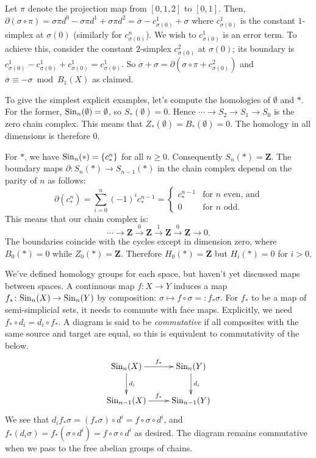 Let $\pi$ denote the projection map from $[0,1,2]$ to $[0,1]$. Then, $\partial(\sigma\circ\pi)=\sigma\pi d^0-\sigma\pi d^1 +\sigma\pi d^2=\overline{\sigma}-c^1_{\sigma(0)}+\sigma$ where $c^1_{\sigma(0)}$ is the constant $1$-simplex at $\sigma(0)$ (similarly for $c^n_{\sigma(0)}$). We wish to $c^1_{\sigma(0)}$ is an error term. To achieve this, consider the constant $2$-simplex $c^2_{\sigma(0)}$ at $\sigma(0)$; its boundary is $c^1_{\sigma(0)}-c^1_{\sigma(0)}+c^1_{\sigma(0)}=c^1_{\sigma(0)}$. So $\overline{\sigma}+\sigma=\partial(\sigma\circ\pi + c^2_{\sigma(0)})$ and $\overline{\sigma}\equiv -\sigma\bmod B_1(X)$ as claimed.

To give the simplest explicit examples, let's compute the homologies of $\emptyset$ and $\ast$. For the former, $\mathrm{Sin}_n(\emptyset)=\emptyset$, so $S_\ast(\emptyset)=0$. Hence $\cdots\to S_2\to S_1\to S_0$ is the zero chain complex. This means that $Z_\ast(\emptyset)=B_\ast(\emptyset)=0$. The homology in all dimensions is therefore $0$.

For $\ast$, we have $\mathrm{Sin}_n(\ast)=\{c^n_\ast\}$ for all $n\geq 0$. Consequently $S_n(\ast)=\mathbf{Z}$. The boundary maps $\partial\colon S_n(\ast)\to S_{n-1}(\ast)$ in the chain complex depend on the parity of $n$ as follows:
\[\partial(c^n_\ast)=\sum_{i=0}^{n}(-1)^i c^{n-1}_\ast=
\begin{cases}
    c^{n-1}_* & \text{for } n \text{ even, and}\\
    0 & \text{for } n \text{ odd.}
  \end{cases}
\]
This means that our chain complex is:
$$\cdots\to\mathbf{Z}\xrightarrow{0}\mathbf{Z}\xrightarrow{1}\mathbf{Z}\xrightarrow{0}\mathbf{Z}\to 0.$$
The boundaries coincide with the cycles except in dimension zero, where $B_0(\ast)=0$ while $Z_0(\ast)=\mathbf{Z}$. Therefore $ H_0(\ast)=\mathbf{Z}$ but $ H_i(\ast)=0$ for $i>0$.

We've defined homology groups for each space, but haven't yet discussed maps between spaces. A continuous map $f\colon X\to Y$ induces a map $f_\ast\colon \mathrm{Sin}_n(X)\to\mathrm{Sin}_n(Y)$ by composition: $\sigma\mapsto f\circ \sigma=:f_\ast\sigma$. For $f_\ast$ to be a map of semi-simplicial sets, it needs to commute with face maps. Explicitly, we need $f_\ast \circ d_i = d_i \circ f_\ast$. A diagram is said to be \emph{commutative} if all composites with the same source and target are equal, so this is equivalent to commutativity of the below.
\begin{eqnarray*}
\xymatrix{\Sin_n(X)\ar[r]^{f_\ast}\ar[d]^{d_i} & \Sin_n(Y)\ar[d]^{d_i}\\
\Sin_{n-1}(X)\ar[r]^{f_\ast} & \Sin_{n-1}(Y)}
\end{eqnarray*}
We see that $d_if_\ast\sigma=(f_\ast\sigma)\circ d^i=f\circ\sigma\circ d^i$, and $f_\ast(d_i\sigma)=f_\ast(\sigma\circ d^i)=f\circ\sigma\circ d^i$ as desired. The diagram remains commutative when we pass to the free abelian groups of chains.

